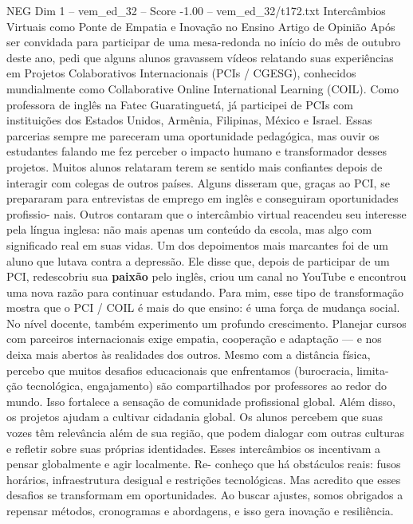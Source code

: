 \begin{textsample}{NEG Dim 1 – vem\_ed\_32 – Score -1.00 – vem\_ed\_32/t172.txt}  \label{ex:f1_neg_032}
Intercâmbios Virtuais como Ponte de Empatia e Inovação no Ensino Artigo de Opinião Após ser convidada para participar de uma mesa-redonda no início do mês de outubro deste ano, pedi que alguns alunos gravassem vídeos relatando suas experiências em Projetos Colaborativos Internacionais (PCIs / CGESG), conhecidos mundialmente como Collaborative Online International Learning (COIL).
Como professora de inglês na Fatec Guaratinguetá, já participei de PCIs com instituições dos Estados Unidos, Armênia, Filipinas, México e Israel.
Essas parcerias sempre me pareceram uma oportunidade pedagógica, mas ouvir os estudantes falando me fez perceber o impacto humano e transformador desses projetos.
Muitos alunos relataram terem se sentido mais confiantes depois de interagir com colegas de outros países.
Alguns disseram que, graças ao PCI, se prepararam para entrevistas de emprego em inglês e conseguiram oportunidades profissio- nais.
Outros contaram que o intercâmbio virtual reacendeu seu interesse pela língua inglesa: não mais apenas um conteúdo da escola, mas algo com significado real em suas vidas.
Um dos depoimentos mais marcantes foi de um aluno que lutava contra a depressão.
Ele disse que, depois de participar de um PCI, redescobriu sua \textbf{paixão} pelo inglês, criou um canal no YouTube e encontrou uma nova razão para continuar estudando.
Para mim, esse tipo de transformação mostra que o PCI / COIL é mais do que ensino: é uma força de mudança social.
No nível docente, também experimento um profundo crescimento.
Planejar cursos com parceiros internacionais exige empatia, cooperação e adaptação — e nos deixa mais abertos às realidades dos outros.
Mesmo com a distância física, percebo que muitos desafios educacionais que enfrentamos (burocracia, limita- ção tecnológica, engajamento) são compartilhados por professores ao redor do mundo.
Isso fortalece a sensação de comunidade profissional global.
Além disso, os projetos ajudam a cultivar cidadania global.
Os alunos percebem que suas vozes têm relevância além de sua região, que podem dialogar com outras culturas e refletir sobre suas próprias identidades.
Esses intercâmbios os incentivam a pensar globalmente e agir localmente.
Re- conheço que há obstáculos reais: fusos horários, infraestrutura desigual e restrições tecnológicas.
Mas acredito que esses desafios se transformam em oportunidades.
Ao buscar ajustes, somos obrigados a repensar métodos, cronogramas e abordagens, e isso gera inovação e resiliência.

\end{textsample}
